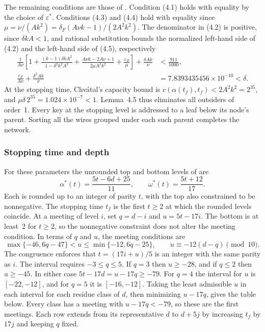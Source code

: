 \documentclass[11pt]{article}
\begin{document}
The remaining conditions are those of \cite[\S4]{chvatal}. Condition (4.1) holds with equality by the choice of \(\varepsilon^*\). Conditions (4.3) and (4.4) hold with equality since \(\mu=\nu/(Ak^2)=\delta_F(A\nu k-1)/(2A^2k^2)\). The denominator in (4.2) is positive, since \(\delta kA<1\), and rational substitution bounds the normalized left-hand side of (4.2) and the left-hand side of (4.5), respectively
\begin{align*}
 \frac{1}{A\nu}\left[1+\frac{(k-1)\delta k A^2}{1-\delta^2 k^2 A^2}
   +\frac{A\nu k-2A\nu+1}{2\mu A^2 k^2}
   +\frac{\varepsilon_B}{\mu}\right]+\frac{\delta Ak}{\nu}
   &< \frac{911}{1000},\\
 \frac{\varepsilon_F}{A\nu}+\frac{\delta^2Ak}{\nu}
   &=7.8393435456\times10^{-10}<\delta.
\end{align*}
At the stopping time, Chv\'atal's capacity bound is \(c(\alpha(t_f),t_f)<2A^2k^2=2^{35}\), and \(\mu\delta\,2^{35}=1.024\times10^{-7}<1\). Lemma~4.5 thus eliminates all outsiders of order~1. Every key at the stopping level is addressed to a leaf below its node's parent. Sorting all the wires grouped under each such parent completes the network.


\subsubsection{Stopping time and depth}

For these parameters the unrounded top and bottom levels of \cite[\S3]{chvatal} are
\[
 \alpha^*(t)=\frac{5t-6d+25}{11},\qquad
 \omega^*(t)=\frac{5t+12}{17}.
\]
Each is rounded up to an integer of parity \(t\), with the top also constrained to be nonnegative. The stopping time \(t_f\) is the first \(t\ge2\) at which the rounded levels coincide. At a meeting of level \(i\), set \(q=d-i\) and \(u=5t-17i\). The bottom is at least~2 for \(t\ge2\), so the nonnegative constraint does not alter the meeting condition. In terms of \(q\) and \(u\), the meeting conditions are
\[
 \max\{-46,6q-47\}<u\le\min\{-12,6q-25\},
 \qquad
 u\equiv -12(d-q)\pmod{10}.
\]
The congruence enforces that \(t=(17i+u)/5\) is an integer with the same parity as \(i\). The interval requires \(-3\le q\le5\). If \(q=3\) then \(u\ge-28\), and if \(q\le2\) then \(u\ge-45\). In either case \(5t-17d=u-17q\ge-79\). For \(q=4\) the interval for \(u\) is \([-22,-12]\), and for \(q=5\) it is \([-16,-12]\). Taking the least admissible \(u\) in each interval for each residue class of \(d\), then minimizing \(u-17q\), gives the table below. Every class has a meeting with \(u-17q<-79\), so these are the first meetings. Each row extends from its representative \(d\) to \(d+5j\) by increasing \(t_f\) by \(17j\) and keeping \(q\) fixed.
\end{document}

